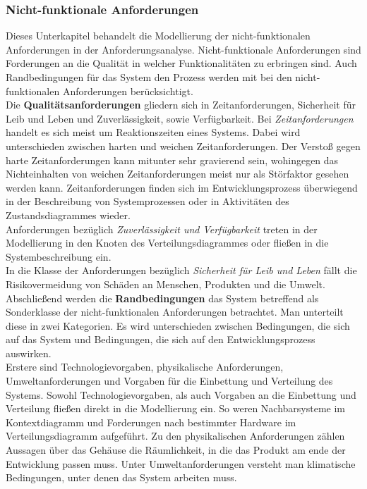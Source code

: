 \documentclass[../Bachelorarbeit.tex]{subfiles}
\begin{document}
\subsubsection{Nicht-funktionale Anforderungen}
Dieses Unterkapitel behandelt die Modellierung der nicht-funktionalen Anforderungen in der Anforderungsanalyse. Nicht-funktionale Anforderungen sind Forderungen an die Qualität in welcher Funktionalitäten zu erbringen sind. Auch Randbedingungen für das System \bzw den Prozess werden mit bei den nicht-funktionalen Anforderungen berücksichtigt.\\ %
Die \textbf{Qualitätsanforderungen} gliedern sich in Zeitanforderungen, Sicherheit für Leib und Leben und Zuverlässigkeit, sowie Verfügbarkeit. Bei \textit{Zeitanforderungen} handelt es sich meist um Reaktionszeiten eines Systems. Dabei wird unterschieden zwischen harten und weichen Zeitanforderungen. Der Verstoß gegen harte Zeitanforderungen kann mitunter sehr gravierend sein, wohingegen das Nichteinhalten von weichen Zeitanforderungen meist nur als Störfaktor gesehen werden kann. Zeitanforderungen finden sich im Entwicklungsprozess überwiegend in der Beschreibung von Systemprozessen oder in Aktivitäten des Zustandsdiagrammes wieder.\\
Anforderungen bezüglich \textit{Zuverlässigkeit und Verfügbarkeit} treten in der Modellierung in den Knoten des Verteilungsdiagrammes oder fließen in die Systembeschreibung ein.\\
In die Klasse der Anforderungen bezüglich \textit{Sicherheit für Leib und Leben} fällt die Risikovermeidung von Schäden an Menschen, Produkten und die Umwelt.\\
Abschließend werden die \textbf{Randbedingungen} das System betreffend als Sonderklasse der nicht-funktionalen Anforderungen betrachtet. Man unterteilt diese in zwei Kategorien. Es wird unterschieden zwischen Bedingungen, die sich auf das System und Bedingungen, die sich auf den Entwicklungsprozess auswirken.\\
Erstere sind Technologievorgaben, physikalische Anforderungen, Umweltanforderungen und Vorgaben für die Einbettung und Verteilung des Systems. Sowohl Technologievorgaben, als auch Vorgaben an die Einbettung und Verteilung fließen direkt in die Modellierung ein. So weren \bspw Nachbarsysteme im Kontextdiagramm und Forderungen nach bestimmter Hardware im Verteilungsdiagramm aufgeführt. Zu den physikalischen Anforderungen zählen \zB Aussagen über das Gehäuse \bzw die Räumlichkeit, in die das Produkt am ende der Entwicklung passen muss. Unter Umweltanforderungen versteht man \bspw klimatische Bedingungen, unter denen das System arbeiten muss.\\
\end{document}
